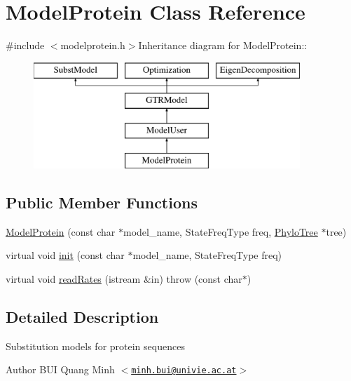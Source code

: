 \hypertarget{classModelProtein}{
\section{ModelProtein Class Reference}
\label{classModelProtein}
}


{\ttfamily \#include $<$modelprotein.h$>$}Inheritance diagram for ModelProtein::\begin{figure}[H]
\begin{center}
\leavevmode
\includegraphics[height=4cm]{classModelProtein}
\end{center}
\end{figure}
\subsection*{Public Member Functions}
\begin{DoxyCompactItemize}
\item 
\hyperlink{classModelProtein_a962861c07a7741cdefb856572fff0757}{ModelProtein} (const char $\ast$model\_\-name, StateFreqType freq, \hyperlink{classPhyloTree}{PhyloTree} $\ast$tree)
\item 
virtual void \hyperlink{classModelProtein_a752778117ce79f5c0161397835fc6bf0}{init} (const char $\ast$model\_\-name, StateFreqType freq)
\item 
virtual void \hyperlink{classModelProtein_a4809c8c2aaa4e5d976214034b3b94df3}{readRates} (istream \&in)  throw (const char$\ast$)
\end{DoxyCompactItemize}


\subsection{Detailed Description}
Substitution models for protein sequences

\begin{DoxyAuthor}{Author}
BUI Quang Minh $<$\href{mailto:minh.bui@univie.ac.at}{\tt minh.bui@univie.ac.at}$>$ 
\end{DoxyAuthor}


